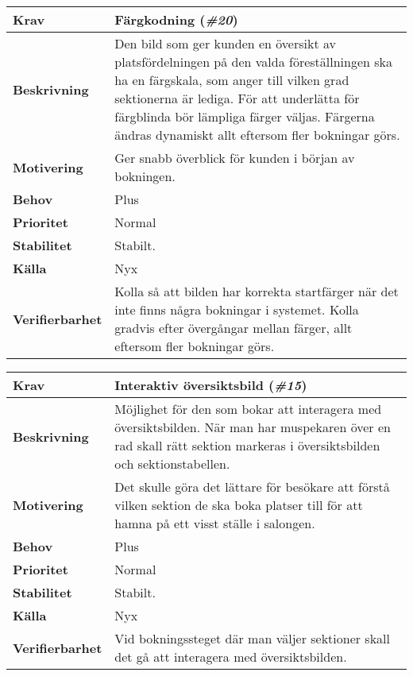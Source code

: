 \documentclass[a4paper, twoside, 11pt, titlepage]{article}
\begin{document}
		\begin{tabular} { p{2.6cm} p{12.5cm} }
			\hline
			\sffamily\textbf{Krav} & Färgkodning (\emph{\#20})  \\
			\hline
			\sffamily\textbf{Beskrivning} & Den bild som ger kunden en översikt av platsfördelningen på den valda föreställningen ska ha en färgskala, som anger till vilken grad sektionerna är lediga. För att underlätta för färgblinda bör lämpliga färger väljas. Färgerna ändras dynamiskt allt eftersom fler bokningar görs.  \\
			\hline
			\sffamily\textbf{Motivering} & Ger snabb överblick för kunden i början av bokningen.  \\
			\hline
			\sffamily\textbf{Behov} & Plus  \\
			\hline
			\sffamily\textbf{Prioritet} & Normal  \\
			\hline
			\sffamily\textbf{Stabilitet} & Stabilt.  \\
			\hline
			\sffamily\textbf{Källa} & Nyx  \\
			\hline
			\sffamily\textbf{Verifierbarhet} & Kolla så att bilden har korrekta startfärger när det inte finns några bokningar i systemet. Kolla gradvis efter övergångar mellan färger, allt eftersom fler bokningar görs.   \\
			\hline
		\end{tabular}
		\vspace{6mm}

		\begin{tabular} { p{2.6cm} p{12.5cm} }
			\hline
			\sffamily\textbf{Krav} & Interaktiv översiktsbild (\emph{\#15})  \\
			\hline
			\sffamily\textbf{Beskrivning} & Möjlighet för den som bokar att interagera med översiktsbilden. När man har muspekaren över en rad skall rätt sektion markeras i översiktsbilden och sektionstabellen.  \\
			\hline
			\sffamily\textbf{Motivering} & Det skulle göra det lättare för besökare att förstå vilken sektion de ska boka platser till för att hamna på ett visst ställe i salongen.  \\
			\hline
			\sffamily\textbf{Behov} & Plus  \\
			\hline
			\sffamily\textbf{Prioritet} & Normal  \\
			\hline
			\sffamily\textbf{Stabilitet} & Stabilt.  \\
			\hline
			\sffamily\textbf{Källa} & Nyx  \\
			\hline
			\sffamily\textbf{Verifierbarhet} & Vid bokningssteget där man väljer sektioner skall det gå att interagera med översiktsbilden.   \\
			\hline
		\end{tabular}
		\vspace{6mm}
\end{document}
